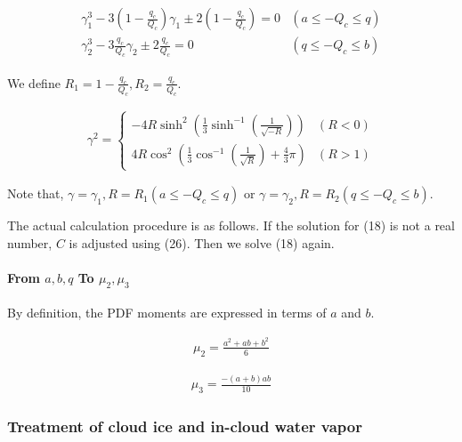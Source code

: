 \begin{eqnarray}
\begin{array}{ll}
\gamma_{1}^{3}-3\left(1-\frac{q_{c}}{Q_{c}}\right) \gamma_{1} \pm 2\left(1-\frac{q_{c}}{Q_{c}}\right)=0 & \left(a \leq-Q_{c} \leq q\right) \\
\gamma_{2}^{3}-3 \frac{q_{c}}{Q_{c}} \gamma_{2} \pm 2 \frac{q_{c}}{Q_{c}}=0 & \left(q \leq-Q_{c} \leq b\right)
\end{array}
\end{eqnarray}

We define \(R_{1}=1-\frac{q_{c}}{Q_{c}}, R_{2}=\frac{q_{c}}{Q_{c}}\).

\begin{eqnarray}
\gamma^{2}=\left\{\begin{array}{ll}
-4 R \sinh ^{2}\left(\frac{1}{3} \sinh ^{-1}\left(\frac{1}{\sqrt{-R}}\right)\right) & (R<0) \\
4 R \cos ^{2}\left(\frac{1}{3} \cos ^{-1}\left(\frac{1}{\sqrt{R}}\right)+\frac{4}{3} \pi\right) & (R>1)
\end{array}\right.
\label{E08-26}
\end{eqnarray}

Note that,
\(\gamma=\gamma_{1}, R=R_{1}\left(a \leq-Q_{c} \leq q\right)\) or
\(\gamma=\gamma_{2}, R=R_{2}\left(q \leq-Q_{c} \leq b\right)\).

The actual calculation procedure is as follows. If the solution for (18)
is not a real number, \(C\) is adjusted using (26). Then we solve (18)
again.

\hypertarget{from-abq-to-mu_2-mu_3}{%
\paragraph{\texorpdfstring{From \(a,b,q\) To
\(\mu_{2}, \mu_{3}\)}{From a,b,q To \textbackslash mu\_\{2\}, \textbackslash mu\_\{3\}}}\label{from-abq-to-mu_2-mu_3}}

By definition, the PDF moments are expressed in terms of \(a\) and
\(b\).

\begin{eqnarray}
\mu_{2}=\frac{a^{2}+ab+b^{2}}{6}
\end{eqnarray}

\begin{eqnarray}
\mu_{3}=\frac{-(a+b) ab}{10}
\end{eqnarray}

\hypertarget{treatment-of-cloud-ice-and-in-cloud-water-vapor}{%
\subsubsection{Treatment of cloud ice and in-cloud water
vapor}\label{treatment-of-cloud-ice-and-in-cloud-water-vapor}}

